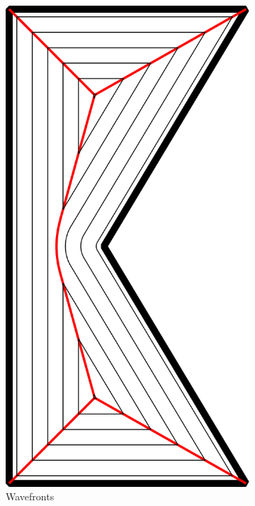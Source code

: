 \begin{figure}
\begin{subfigure}{0.3\columnwidth}
\includegraphics[height=1.5\columnwidth]{sources/method/MAT_explanation_wavefronts.pdf}
\caption{Wavefronts}
\end{subfigure}
\begin{subfigure}{0.3\columnwidth}
\centering

\end{subfigure}
\end{figure}
